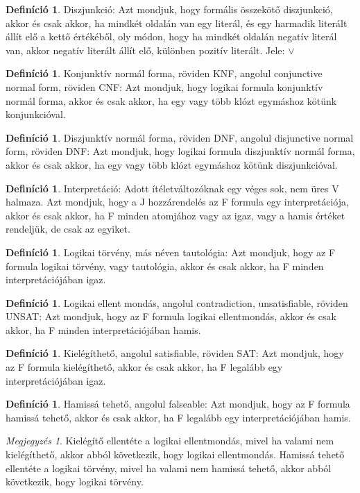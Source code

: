 \documentclass[
]{thesis-ekf}
\theoremstyle{definition}
\newtheorem{definicio}[tetel]{Definíció}
\theoremstyle{remark}
\newtheorem{megjegyzes}[tetel]{Megjegyzés}
\begin{document}
	\begin{definicio}
		Diszjunkció: Azt mondjuk, hogy formális összekötő diszjunkció, akkor és csak akkor, ha mindkét oldalán van egy literál, és egy harmadik literált állít elő a kettő értékéből, oly módon, hogy ha mindkét oldalán negatív literál van, akkor negatív literált állít elő, különben pozitív literált. Jele: $\vee$
	\end{definicio}
	\begin{definicio} %
		Konjunktív normál forma, röviden KNF, angolul conjunctive normal form, röviden CNF: Azt mondjuk, hogy logikai formula konjunktív normál forma, akkor és csak akkor, ha egy vagy több klózt egymáshoz kötünk konjunkcióval.
	\end{definicio}
	\begin{definicio}
		Diszjunktív normál forma, röviden DNF, angolul disjunctive normal form, röviden DNF: Azt mondjuk, hogy logikai formula diszjunktív normál forma, akkor és csak akkor, ha egy vagy több klózt egymáshoz kötünk diszjunkcióval.
	\end{definicio}
	\begin{definicio}
		Interpretáció: Adott ítéletváltozóknak egy véges sok, nem üres V halmaza.
		Azt mondjuk, hogy a J hozzárendelés az F formula egy interpretációja, akkor és csak akkor, ha F minden atomjához vagy az igaz, vagy a hamis értéket rendeljük, de csak az egyiket.
	\end{definicio}
	\begin{definicio}
		Logikai törvény, más néven tautológia: Azt mondjuk, hogy az F formula logikai törvény, vagy tautológia, akkor és csak akkor, ha F minden interpretációjában igaz.
	\end{definicio}
	\begin{definicio}
		Logikai ellent mondás, angolul contradiction, unsatisfiable, röviden UNSAT: Azt mondjuk, hogy az F formula logikai ellentmondás, akkor és csak akkor, ha F minden interpretációjában hamis.
	\end{definicio}
	\begin{definicio}
		Kielégíthető, angolul satisfiable, röviden SAT: Azt mondjuk, hogy az F formula kielégíthető, akkor és csak akkor, ha F legalább egy interpretációjában igaz.
	\end{definicio}
	\begin{definicio}
		Hamissá tehető, angolul falseable: Azt mondjuk, hogy az F formula hamissá tehető, akkor és csak akkor, ha F legalább egy interpretációjában hamis. 
	\end{definicio}
	\begin{megjegyzes}
		Kielégítő ellentéte a logikai ellentmondás, mivel ha valami nem kielégíthető, akkor abból következik, hogy logikai ellentmondás.
		Hamissá tehető ellentéte a logikai törvény, mivel ha valami nem hamissá tehető, akkor abból következik, hogy logikai törvény.
	\end{megjegyzes}
\end{document}
